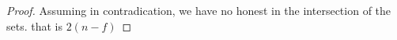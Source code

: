  \begin{proof}
Assuming in contradication, we have no honest in the intersection of the sets. 
that is $2(n-f)$
 \end{proof}














